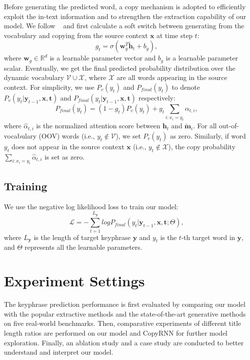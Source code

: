 \documentclass[letterpaper]{article} %
\begin{document}
Before generating the predicted word, a copy mechanism is adopted to efficiently exploit the in-text information and to strengthen the extraction capability of our model. We follow \citeauthor{see2017get_to_the_point}~ and first calculate a soft switch between generating from the vocabulary and copying from the source context $\mathbf{x}$ at time step $t$:
\begin{equation}
g_t = \sigma(\mathbf{w}^T_g\tilde{\mathbf{h}}_{t} + b_g),
\end{equation}
where $\mathbf{w}_g \in \mathbb{R}^d$ is a learnable parameter vector and $b_g$ is a learnable parameter scalar.
Eventually, we get the final predicted probability distribution over the dynamic vocabulary $\mathcal{V}\cup \mathcal{X}$, where $\mathcal{X}$ are all words appearing in the source context. For simplicity, we use $P_v(y_t)$ and  $P_{final}(y_t)$ to denote $P_v(y_{t}|\mathbf{y}_{t-1}, \mathbf{x}, \mathbf{t})$ and $P_{final}(y_{t}|\mathbf{y}_{t-1}, \mathbf{x}, \mathbf{t})$ respectively:
\begin{equation}
P_{final}(y_t) = (1-g_t) P_v(y_t) + g_t\sum_{i:x_i=y_t}\hat{\alpha}_{t,i},
\end{equation}
where $\hat{\alpha}_{t,i}$ is the normalized attention score between $\mathbf{h}_t$ and $\widetilde{\mathbf{m}}_i$.
For all out-of-vocabulary (OOV) words (i.e., $y_t\notin \mathcal{V}$), we set $P_{v}(y_t)$ as zero. Similarly, if word $y_t$ does not appear in the source context $\mathbf{x}$ (i.e., $y_t\notin \mathcal{X}$), the copy probability $\sum_{i:x_i=y_t}\hat{\alpha}_{t,i}$ is set as zero.

\subsection{Training}
We use the negative log likelihood loss to train our model:
\begin{equation}
\mathcal{L} = -\sum_{t=1}^{L_{\mathbf{y}}} log P_{final}(y_t|\mathbf{y}_{t-1}, \mathbf{x}, \mathbf{t}; \Theta),
\end{equation}
where $L_{\mathbf{y}}$ is the length of target keyphrase $\mathbf{y}$ and $y_t$ is the $t$-th target word in $\mathbf{y}$, and $\Theta$ represents all the learnable parameters.

\section{Experiment Settings} \label{section: exp_settings}
The keyphrase prediction performance is first evaluated by comparing our model with the popular extractive methods and the state-of-the-art generative methods on five real-world benchmarks. Then, comparative experiments of different title length ratios are performed on our model and CopyRNN for further model exploration. Finally, an ablation study and a case study are conducted to better understand and interpret our model.
\end{document}
